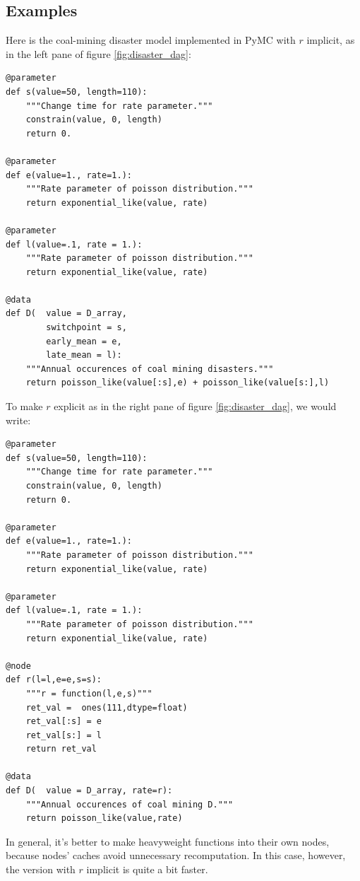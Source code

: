 \documentclass[]{book}
\begin{document}
\subsection{Examples}\label{sub:example}
Here is the coal-mining disaster model implemented in PyMC with $r$ implicit, as in the left pane of figure \ref{fig:disaster_dag}:
\begin{verbatim}
@parameter
def s(value=50, length=110):
    """Change time for rate parameter."""
    constrain(value, 0, length)
    return 0.

@parameter
def e(value=1., rate=1.):
    """Rate parameter of poisson distribution."""
    return exponential_like(value, rate)

@parameter
def l(value=.1, rate = 1.):
    """Rate parameter of poisson distribution."""
    return exponential_like(value, rate)

@data
def D(  value = D_array,
        switchpoint = s,
        early_mean = e,
        late_mean = l):
    """Annual occurences of coal mining disasters."""
    return poisson_like(value[:s],e) + poisson_like(value[s:],l)
\end{verbatim}
To make $r$ explicit as in the right pane of figure \ref{fig:disaster_dag}, we would write:
\begin{verbatim}
@parameter
def s(value=50, length=110):
    """Change time for rate parameter."""
    constrain(value, 0, length)
    return 0.

@parameter
def e(value=1., rate=1.):
    """Rate parameter of poisson distribution."""
    return exponential_like(value, rate)

@parameter
def l(value=.1, rate = 1.):
    """Rate parameter of poisson distribution."""
    return exponential_like(value, rate)

@node
def r(l=l,e=e,s=s):
    """r = function(l,e,s)"""
    ret_val =  ones(111,dtype=float)
    ret_val[:s] = e
    ret_val[s:] = l
    return ret_val

@data
def D(  value = D_array, rate=r):
    """Annual occurences of coal mining D."""
    return poisson_like(value,rate)
\end{verbatim}
In general, it's better to make heavyweight functions into their own nodes, because nodes' caches avoid unnecessary recomputation. In this case, however, the version with $r$ implicit is quite a bit faster.
\end{document}
